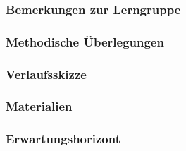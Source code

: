 \subsubsection{Bemerkungen zur Lerngruppe}\label{ssec:project:34:lerngruppe}
\subsubsection{Methodische Überlegungen}
\subsubsection{Verlaufsskizze}
\subsubsection{Materialien}
\subsubsection{Erwartungshorizont}
